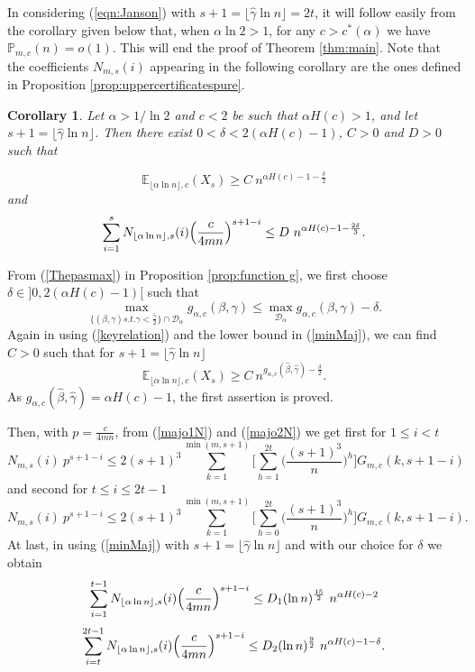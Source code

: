 \documentclass[aop,noinfoline]{imsart}
\newtheorem{corollary}[theorem]{Corollary}
\renewcommand{\Box}{{\vrule width0.6ex height1em depth0cm}}
\newenvironment{proof}{\noindent{\bf Proof:}}{\hfill \Box}
\newcommand{\EE}{\mathbb{E}}
\newcommand{\pmc}{\mathbb{P}_{m,c}}
\renewcommand{\hat}{\widehat}
\begin{document}
In considering (\ref{eqn:Janson}) with $s+1=\lfloor\hat{\gamma} \ln n
\rfloor= 2t$,  it will follow easily from the  corollary  given below
that, when $\alpha \ln 2>1$,  for any $c>c^{*}(\alpha)$ we have
$\pmc(n)=o(1)$. This will end the proof of Theorem \ref{thm:main}. Note that the coefficients $N_{m,s}(i)$ appearing in the following corollary are the ones defined in Proposition \ref{prop:uppercertificatespure}.
\begin{corollary}\label{upperbound}
Let $\alpha>1/\ln 2$ and $c< 2$ be such that $\alpha H(c)>1$, and let
$s+1=\lfloor\hat{\gamma} \ln n \rfloor$. Then there exist
$0<\delta<2(\alpha H(c)-1)$, $C>0$ and $D>0$ such that   

$$ \EE_{\lfloor \alpha \ln n \rfloor, c} (X_s) \ge C \ n^{\alpha H(c) -1 - \frac{\delta}{2}}$$
and 
$$\sum_{i=1}^s N_{\lfloor \alpha \ln n \rfloor,s}  (i) \Bigl ( \frac{c}{4mn} \Bigr )^{s+1-i} \le D \   n^{\alpha H(c) -1 - \frac{2\delta}{3}}.$$
\end{corollary}
\begin{proof} 
From  (\ref{Thepasmax}) in Proposition \ref{prop:function g}, we first choose $\delta\in ]0,2(\alpha H(c)-1)[$ such that 
 $$ \max_{\{ (\beta, \gamma) s.t. \gamma < \frac{\hat\gamma}{2}\} \cap \mathcal{D}_{\alpha}} g_{\alpha, c}(\beta, \gamma)\le  \max_{\mathcal{D}_{\alpha}} g_{\alpha, c}(\beta, \gamma)- \delta.$$
Again in using (\ref {keyrelation}) and   the lower bound in (\ref{minMaj}), we can find $C>0$ such that for $s+1=\lfloor\hat{\gamma} \ln n\rfloor$ 
$$\EE_{\lfloor \alpha \ln n \rfloor, c} (X_s) \ge C \ n^{ g_{\alpha, c}(\hat{\beta}, \hat{\gamma})-\frac{\delta}{2}}.$$
As $ g_{\alpha, c}(\hat{\beta}, \hat{\gamma})=\alpha H(c) -1 $, the first assertion is proved.


Then, with $\displaystyle p= \frac{c}{4mn}$,   from (\ref{majo1N}) and  (\ref{majo2N})  we get first for $1\le i<t$ 
$$N_{m,s}  (i) \ p^{s+1-i} \le 
2 (s+1)^3 \sum_{k=1}^{\min (m, s+1)} \Biggl [ \sum_{h=1}^{2t} \bigl ( \frac{ (s+1)^3}{n}\bigr )^h \Biggr ] G_{m, c} (k,s+1-i)$$
and second for $t\le i\le 2t-1$ 
$$N_{m,s}  (i) \ p^{s+1-i} \le 
2 (s+1)^3 \sum_{k=1}^{\min (m, s+1)} \Biggl [ \sum_{h=0}^{2t} \bigl ( \frac{ (s+1)^3}{n}\bigr )^h \Biggr ] G_{m, c} (k,s+1-i).$$
At last, in using (\ref{minMaj}) with $s+1=\lfloor\hat{\gamma} \ln n \rfloor$ and with our choice for $\delta$ we obtain 
$$\sum_{i=1}^{t-1} N_{\lfloor \alpha \ln n \rfloor,s}  (i) \Bigl ( \frac{c}{4mn} \Bigr )^{s+1-i} \le D_1(\ln n )^{\frac{15}{2}}  \   n^{\alpha H(c) -2}$$
$$\sum_{i=t}^{2t-1} N_{\lfloor \alpha \ln n \rfloor,s}  (i) \Bigl ( \frac{c}{4mn} \Bigr )^{s+1-i} \le D_2(\ln n )^{\frac{9}{2}}  \   n^{\alpha H(c) -1-\delta}.$$


\end{proof}
\end{document}
